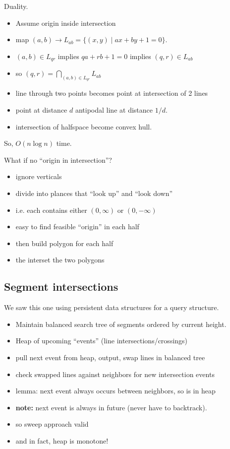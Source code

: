 \documentclass{article}
\begin{document}
Duality. 
\begin{itemize}
\item Assume origin inside intersection
\item map $(a,b) \rightarrow L_{ab} = \{(x,y) \mid ax+by+1=0\}$.
\item $(a,b) \in L_{qr}$ implies $qa+rb+1=0$ implies $(q,r) \in
  L_{ab}$
\item so $(q,r) = \bigcap_{(a,b) \in L_{qr}} L_{ab}$ 
\item line through two points becomes point at intersection of 2 lines
\item point at distance $d$ antipodal line at distance $1/d$.
\item intersection of halfspace become convex hull.
\end{itemize}

So, $O(n\log n)$ time.

What if no ``origin in intersection''?
\begin{itemize}
\item ignore verticals
\item divide into plances that ``look up'' and ``look down''
\item i.e. each contains either $(0,\infty)$ or $(0,-\infty)$
\item easy to find feasible ``origin'' in each half
\item then build polygon for each half
\item the interset the two polygons
\end{itemize}

\subsection{Segment intersections}

We saw this one using persistent data structures for a query structure.
\begin{itemize}
\item Maintain balanced search tree of segments ordered by current height.
\item Heap of upcoming ``events'' (line intersections/crossings)
\item pull next event from heap, output, swap lines in balanced tree
\item check swapped lines against neighbors for new intersection
  events
\item lemma: next event always occurs between neighbors, so is in heap
\item \textbf{ note:} next event is always in future (never have to
  backtrack).
\item so sweep approach valid
\item and in fact, heap is monotone!
\end{itemize}
\end{document}

